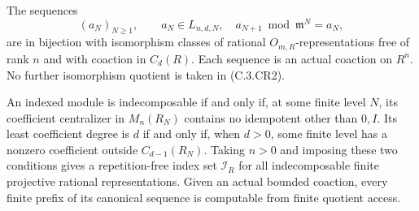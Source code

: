 \begin{theorem}
\label{C:complete-finite-canonical}
The sequences
\[
 (a_N)_{N\geq1},\qquad
 a_N\in L_{n,d,N},\quad a_{N+1}\bmod\mathfrak m^N=a_N,
                                                               \tag{C.3.CR2}
\]
are in bijection with isomorphism classes of rational
$O_{m,R}$-representations free of rank $n$ and with
coaction in $C_d(R)$.
Each sequence is an actual coaction on $R^n$.
No further isomorphism quotient is taken in (C.3.CR2).

An indexed module is indecomposable if and only if, at
some finite level $N$, its coefficient centralizer in
$M_n(R_N)$ contains no idempotent other than $0,I$.
Its least coefficient degree is $d$ if and only if,
when $d>0$, some finite level has a nonzero coefficient
outside $C_{d-1}(R_N)$.
Taking $n>0$ and imposing these two conditions gives
a repetition-free index set $\mathscr I_R$ for all
indecomposable finite projective rational representations.
Given an actual bounded coaction, every finite prefix
of its canonical sequence is computable from finite
quotient access.
\end{theorem}
